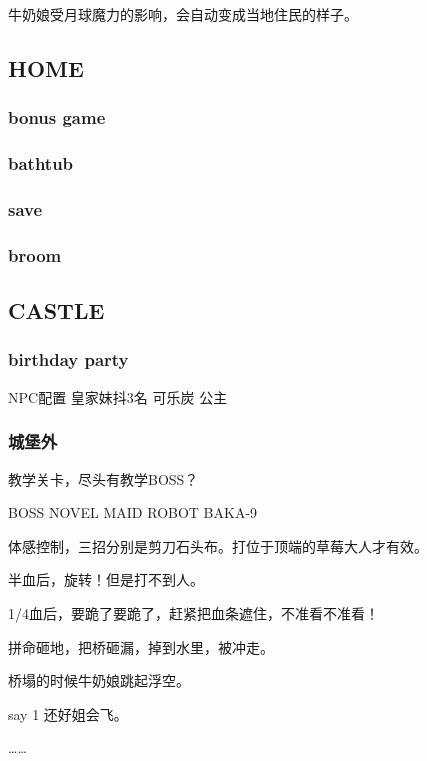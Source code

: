 \documentclass{article}
\begin{document}
牛奶娘受月球魔力的影响，会自动变成当地住民的样子。

\subsection{HOME}

\subsubsection{bonus game}

\subsubsection{bathtub}

\subsubsection{save}

\subsubsection{broom}

\subsection{CASTLE}

\subsubsection{birthday party}

NPC配置 皇家妹抖3名 可乐炭 公主

\subsubsection{城堡外}

教学关卡，尽头有教学BOSS？

BOSS NOVEL MAID ROBOT BAKA-9

体感控制，三招分别是剪刀石头布。打位于顶端的草莓大人才有效。

半血后，旋转！但是打不到人。

1/4血后，要跪了要跪了，赶紧把血条遮住，不准看不准看！

拼命砸地，把桥砸漏，掉到水里，被冲走。

桥塌的时候牛奶娘跳起浮空。

say 1 还好姐会飞。

……
\end{document}
